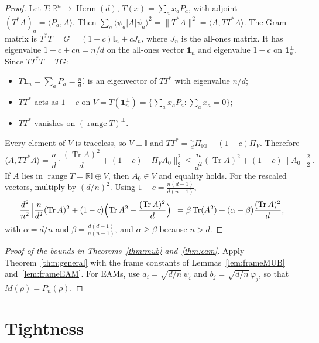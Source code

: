 \documentclass[11pt]{amsart}
\theoremstyle{definition}
\theoremstyle{remark}
\newcommand{\R}{\mathbb{R}}
\newcommand{\Tr}{\operatorname{Tr}}
\newcommand{\Herm}{\operatorname{Herm}}
\newcommand{\one}{\mathbb{I}}
\newcommand{\ket}[1]{|#1\rangle}
\newcommand{\bra}[1]{\langle #1|}
\begin{document}
\begin{proof}
Let $T:\R^n\to\Herm(d)$, $T(x)=\sum_ax_aP_a$, with adjoint $(T^*A)_a=\langle P_a,A\rangle$. Then
$\sum_a\bra{\psi_a}A\ket{\psi_a}^2=\|T^*A\|^2=\langle A,TT^*A\rangle$. The Gram matrix is
$T^*T=G=(1-c)\one_n+cJ_n$, where $J_n$ is the all-ones matrix. It has eigenvalue $1-c+cn=n/d$ on the all-ones
vector $\mathbf 1_n$ and eigenvalue $1-c$ on $\mathbf 1_n^\perp$. Since $TT^*T=TG$:
\begin{itemize}
\item $T\mathbf 1_n=\sum_aP_a=\frac nd\one$ is an eigenvector of $TT^*$ with eigenvalue $n/d$;
\item $TT^*$ acts as $1-c$ on $V=T(\mathbf 1_n^\perp)=\{\sum_ax_aP_a:\sum_ax_a=0\}$;
\item $TT^*$ vanishes on $(\operatorname{range}T)^\perp$.
\end{itemize}
Every element of $V$ is traceless, so $V\perp\one$ and $TT^*=\frac nd\Pi_{\R\one}+(1-c)\Pi_V$. Therefore
\[
\langle A,TT^*A\rangle=\frac nd\cdot\frac{(\Tr A)^2}{d}+(1-c)\|\Pi_VA_0\|_2^2
\le\frac n{d^2}(\Tr A)^2+(1-c)\|A_0\|_2^2 .
\]
If $A$ lies in $\operatorname{range}T=\R\one\oplus V$, then $A_0\in V$ and equality holds. For the rescaled
vectors, multiply by $(d/n)^2$. Using $1-c=\frac{n(d-1)}{d(n-1)}$,
\[
\frac{d^2}{n^2}\Bigl[\frac n{d^2}(\Tr A)^2+(1-c)\Bigl(\Tr A^2-\frac{(\Tr A)^2}{d}\Bigr)\Bigr]
=\beta\Tr(A^2)+(\alpha-\beta)\frac{(\Tr A)^2}{d},
\]
with $\alpha=d/n$ and $\beta=\frac{d(d-1)}{n(n-1)}$, and $\alpha\ge\beta$ because $n>d$.
\end{proof}

\begin{proof}[Proof of the bounds in Theorems~\ref{thm:mub} and~\ref{thm:eam}]
Apply Theorem~\ref{thm:general} with the frame constants of Lemmas~\ref{lem:frameMUB} and~\ref{lem:frameEAM}. For
EAMs, use $a_i=\sqrt{d/n}\,\psi_i$ and $b_j=\sqrt{d/n}\,\varphi_j$, so that $M(\rho)=P_n(\rho)$.
\end{proof}

\section{Tightness}\label{sec:tight}
\end{document}
